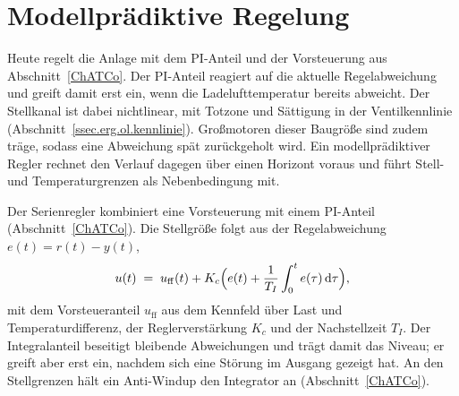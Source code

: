 
\section{Modellprädiktive Regelung}
Heute regelt die Anlage mit dem PI-Anteil und der Vorsteuerung aus
Abschnitt~\ref{ChATCo}. Der PI-Anteil reagiert auf die
aktuelle Regelabweichung und greift damit erst ein, wenn die Ladelufttemperatur
bereits abweicht. Der Stellkanal ist dabei nichtlinear, mit Totzone und Sättigung
in der Ventilkennlinie (Abschnitt~\ref{ssec.erg.ol.kennlinie}). Großmotoren
dieser Baugröße sind zudem träge, sodass eine Abweichung spät zurückgeholt wird.
Ein modellprädiktiver Regler rechnet den Verlauf dagegen über einen Horizont
voraus und führt Stell- und Temperaturgrenzen als Nebenbedingung mit.

Der Serienregler kombiniert eine Vorsteuerung mit einem PI-Anteil
(Abschnitt~\ref{ChATCo}). Die Stellgröße folgt aus der Regelabweichung
$e(t) = r(t) - y(t)$,
\begin{equation}
  \label{eq.grundlagen.pi}
  u(t) \;=\; u_{\mathrm{ff}}(t)
  + K_c \Bigl( e(t) + \frac{1}{T_I} \int_0^t e(\tau)\,\mathrm d\tau \Bigr),
\end{equation}
mit dem Vorsteueranteil $u_{\mathrm{ff}}$ aus dem Kennfeld über Last
und Temperaturdifferenz, der Reglerverstärkung $K_c$ und der
Nachstellzeit $T_I$. Der Integralanteil beseitigt bleibende
Abweichungen und trägt damit das Niveau; er greift aber erst ein,
nachdem sich eine Störung im Ausgang gezeigt hat. An den Stellgrenzen
hält ein Anti-Windup den Integrator an (Abschnitt~\ref{ChATCo}).

